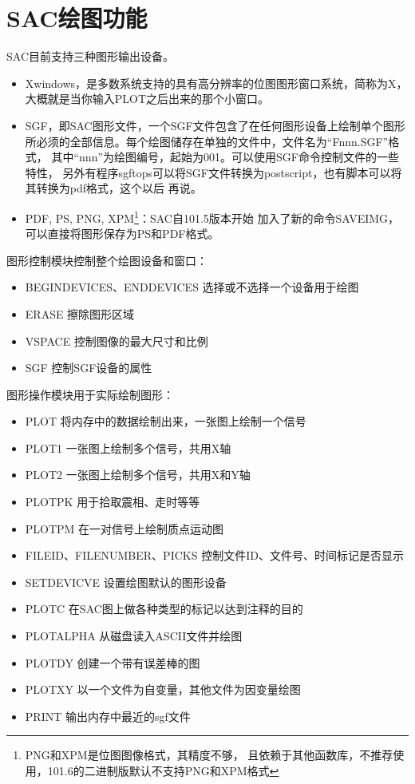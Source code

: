 \section{SAC绘图功能}
SAC目前支持三种图形输出设备。
\begin{itemize}
\item Xwindows，是多数系统支持的具有高分辨率的位图图形窗口系统，简称为X，
大概就是当你输入PLOT之后出来的那个小窗口。
\item SGF，即SAC图形文件，一个SGF文件包含了在任何图形设备上绘制单个图形
所必须的全部信息。每个绘图储存在单独的文件中，文件名为``Fnnn.SGF''格式，
其中``nnn''为绘图编号，起始为001。可以使用SGF命令控制文件的一些特性，
另外有程序sgftops可以将SGF文件转换为postscript，也有脚本可以将其转换为pdf格式，这个以后
再说。
\item PDF, PS, PNG, XPM\footnote{PNG和XPM是位图图像格式，其精度不够，
且依赖于其他函数库，不推荐使用，101.6的二进制版默认不支持PNG和XPM格式}：SAC自101.5版本开始
加入了新的命令SAVEIMG，可以直接将图形保存为PS和PDF格式。
\end{itemize}

图形控制模块控制整个绘图设备和窗口：
\begin{itemize}
\renewcommand\labelitemi{\dag}	%
\item BEGINDEVICES、ENDDEVICES 选择或不选择一个设备用于绘图
\item ERASE 擦除图形区域
\item VSPACE 控制图像的最大尺寸和比例
\item SGF 控制SGF设备的属性
\end{itemize}

图形操作模块用于实际绘制图形：
\begin{itemize}
\renewcommand\labelitemi{\dag}	%
\item PLOT 将内存中的数据绘制出来，一张图上绘制一个信号
\item PLOT1 一张图上绘制多个信号，共用X轴
\item PLOT2 一张图上绘制多个信号，共用X和Y轴
\item PLOTPK 用于拾取震相、走时等等
\item PLOTPM 在一对信号上绘制质点运动图
\item FILEID、FILENUMBER、PICKS 控制文件ID、文件号、时间标记是否显示
\item SETDEVICVE 设置绘图默认的图形设备
\item PLOTC 在SAC图上做各种类型的标记以达到注释的目的
\item PLOTALPHA 从磁盘读入ASCII文件并绘图
\item PLOTDY 创建一个带有误差棒的图
\item PLOTXY 以一个文件为自变量，其他文件为因变量绘图
\item PRINT 输出内存中最近的sgf文件
\end{itemize}

